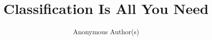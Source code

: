 \documentclass{article}
\title{Classification Is All You Need}
\author{Anonymous Author(s)}
\begin{document}
\maketitle














\label{end:main}




\clearpage
\appendix


% 
\end{document}
